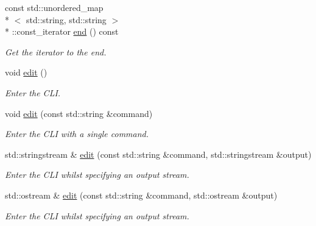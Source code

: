 \begin{DoxyCompactItemize}
const std\-::unordered\-\_\-map\\*
$<$ std\-::string, std\-::string $>$\\*
\-::const\-\_\-iterator \hyperlink{classttl_1_1_valman_a3677bf33ca1e1be881dfb6b4f408adab}{end} () const 
\begin{DoxyCompactList}\small\item\em Get the iterator to the end. \end{DoxyCompactList}\item 
\hypertarget{classttl_1_1_valman_a4099a57f87bd220a24446f70041231be}{void \hyperlink{classttl_1_1_valman_a4099a57f87bd220a24446f70041231be}{edit} ()}\label{classttl_1_1_valman_a4099a57f87bd220a24446f70041231be}

\begin{DoxyCompactList}\small\item\em Enter the C\-L\-I. \end{DoxyCompactList}\item 
\hypertarget{classttl_1_1_valman_aee9df8369fcad995d061b1928d1591d4}{void \hyperlink{classttl_1_1_valman_aee9df8369fcad995d061b1928d1591d4}{edit} (const std\-::string \&command)}\label{classttl_1_1_valman_aee9df8369fcad995d061b1928d1591d4}

\begin{DoxyCompactList}\small\item\em Enter the C\-L\-I with a single command. \end{DoxyCompactList}\item 
\hypertarget{classttl_1_1_valman_aaef50349af0a4f80c7c47785e2e4bc5f}{std\-::stringstream \& \hyperlink{classttl_1_1_valman_aaef50349af0a4f80c7c47785e2e4bc5f}{edit} (const std\-::string \&command, std\-::stringstream \&output)}\label{classttl_1_1_valman_aaef50349af0a4f80c7c47785e2e4bc5f}

\begin{DoxyCompactList}\small\item\em Enter the C\-L\-I whilst specifying an output stream. \end{DoxyCompactList}\item 
\hypertarget{classttl_1_1_valman_ae64b9d9140407189d74dcb9eada6c5b6}{std\-::ostream \& \hyperlink{classttl_1_1_valman_ae64b9d9140407189d74dcb9eada6c5b6}{edit} (const std\-::string \&command, std\-::ostream \&output)}\label{classttl_1_1_valman_ae64b9d9140407189d74dcb9eada6c5b6}

\begin{DoxyCompactList}\small\item\em Enter the C\-L\-I whilst specifying an output stream. \end{DoxyCompactList}\end{DoxyCompactItemize}


